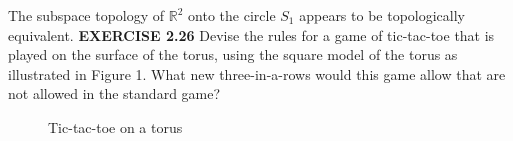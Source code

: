 \documentclass[12pt]{article}
\begin{document}
  \newline
  \newline
  The subspace topology of \(\mathbb{R}^2\) onto the circle \(S_1\) appears to be topologically equivalent.
  \newpage
  \noindent
  \textbf{EXERCISE 2.26}
  Devise the rules for a game of tic-tac-toe that is played on the surface of the torus, using the square model of the torus as illustrated in Figure 1. What new three-in-a-rows would this game allow that are not allowed in the standard game?
  \newline
  \begin{figure}[ht]
    \centering
    \caption{Tic-tac-toe on a torus}
  \end{figure}
  \newline
\end{document}
